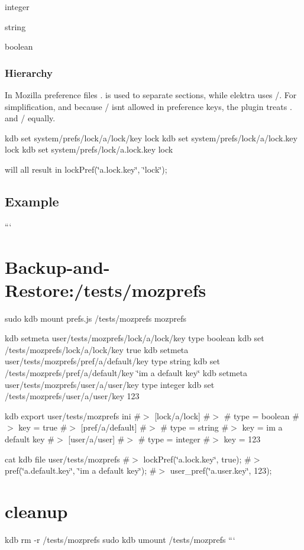 \begin{DoxyItemize}
\item {\ttfamily integer}
\item {\ttfamily string}
\item {\ttfamily boolean}
\end{DoxyItemize}

\subsubsection*{Hierarchy}

In Mozilla preference files {\ttfamily .} is used to separate sections, while elektra uses {\ttfamily /}. For simplification, and because {\ttfamily /} isn\textquotesingle{}t allowed in preference keys, the plugin treats {\ttfamily .} and {\ttfamily /} equally. \begin{DoxyVerb}kdb set system/prefs/lock/a/lock/key lock
kdb set system/prefs/lock/a/lock.key lock
kdb set system/prefs/lock/a.lock.key lock
\end{DoxyVerb}


will all result in {\ttfamily lock\+Pref(\char`\"{}a.\+lock.\+key\char`\"{}, \char`\"{}lock\char`\"{});}

\subsection*{Example}

``` \section*{Backup-\/and-\/\+Restore\+:/tests/mozprefs}

sudo kdb mount prefs.\+js /tests/mozprefs mozprefs

kdb setmeta user/tests/mozprefs/lock/a/lock/key type boolean kdb set /tests/mozprefs/lock/a/lock/key true kdb setmeta user/tests/mozprefs/pref/a/default/key type string kdb set /tests/mozprefs/pref/a/default/key \char`\"{}i\textquotesingle{}m a default key\char`\"{} kdb setmeta user/tests/mozprefs/user/a/user/key type integer kdb set /tests/mozprefs/user/a/user/key 123

kdb export user/tests/mozprefs ini \#$>$ \mbox{[}lock/a/lock\mbox{]} \#$>$ \# type = boolean \#$>$ key = true \#$>$ \mbox{[}pref/a/default\mbox{]} \#$>$ \# type = string \#$>$ key = i\textquotesingle{}m a default key \#$>$ \mbox{[}user/a/user\mbox{]} \#$>$ \# type = integer \#$>$ key = 123

cat {\ttfamily kdb file user/tests/mozprefs} \#$>$ lock\+Pref(\char`\"{}a.\+lock.\+key\char`\"{}, true); \#$>$ pref(\char`\"{}a.\+default.\+key\char`\"{}, \char`\"{}i\textquotesingle{}m a default key\char`\"{}); \#$>$ user\+\_\+pref(\char`\"{}a.\+user.\+key\char`\"{}, 123);

\section*{cleanup}

kdb rm -\/r /tests/mozprefs sudo kdb umount /tests/mozprefs ``` 